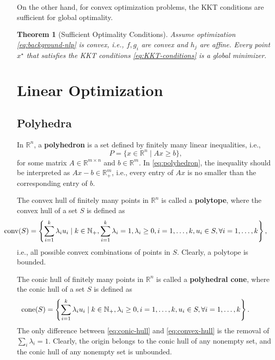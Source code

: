 \documentclass[
]{book}
\newtheorem{theorem}{Theorem}[chapter]
\theoremstyle{definition}
\theoremstyle{definition}
\theoremstyle{definition}
\theoremstyle{definition}
\theoremstyle{remark}
\begin{document}
On the other hand, for convex optimization problems, the KKT conditions are sufficient for global optimality.

\begin{theorem}[Sufficient Optimality Conditions]
\protect\hypertarget{thm:KKTSufficient}{}\label{thm:KKTSufficient}Assume optimization \eqref{eq:background-nlp} is convex, i.e., \(f,g_i\) are convex and \(h_j\) are affine. Every point \(x^\star\) that satisfies the KKT conditions \eqref{eq:KKT-conditions} is a global minimizer.
\end{theorem}

\section{Linear Optimization}\label{background:linear:optimization}

\subsection{Polyhedra}\label{polyhedra}

In \(\mathbb{R}^{n}\), a \textbf{polyhedron} is a set defined by finitely many linear inequalities, i.e.,
\begin{equation}
P = \{ x \in \mathbb{R}^{n} \mid A x \geq b \},
\label{eq:polyhedron}
\end{equation}
for some matrix \(A \in \mathbb{R}^{m \times n}\) and \(b \in \mathbb{R}^{m}\). In \eqref{eq:polyhedron}, the inequality should be interpreted as \(A x - b \in \mathbb{R}^{m}_{+}\), i.e., every entry of \(Ax\) is no smaller than the corresponding entry of \(b\).

The convex hull of finitely many points in \(\mathbb{R}^{n}\) is called a \textbf{polytope}, where the convex hull of a set \(S\) is defined as
\begin{equation}
\hspace{-10mm} \mathrm{conv}(S) =  \left\{ \sum_{i=1}^k \lambda_i u_i \mid k \in \mathbb{N}_{+}, \sum_{i=1}^k \lambda_i = 1, \lambda_i \geq 0,i=1,\dots,k, u_i \in S, \forall i =1,\dots,k \right\} ,
\label{eq:convex-hull}
\end{equation}
i.e., all possible convex combinations of points in \(S\). Clearly, a polytope is bounded.

The conic hull of finitely many points in \(\mathbb{R}^{n}\) is called a \textbf{polyhedral cone}, where the conic hull of a set \(S\) is defined as
\begin{equation}
\hspace{-10mm} \mathrm{cone}(S) =  \left\{  \sum_{i=1}^k \lambda_i u_i \mid k \in \mathbb{N}_{+}, \lambda_i \geq 0,i=1,\dots,k, u_i \in S, \forall i =1,\dots,k   \right\} .
\label{eq:conic-hull}
\end{equation}
The only difference between \eqref{eq:conic-hull} and \eqref{eq:convex-hull} is the removal of \(\sum_{i} \lambda_i = 1\). Clearly, the origin belongs to the conic hull of any nonempty set, and the conic hull of any nonempty set is unbounded.
\end{document}
